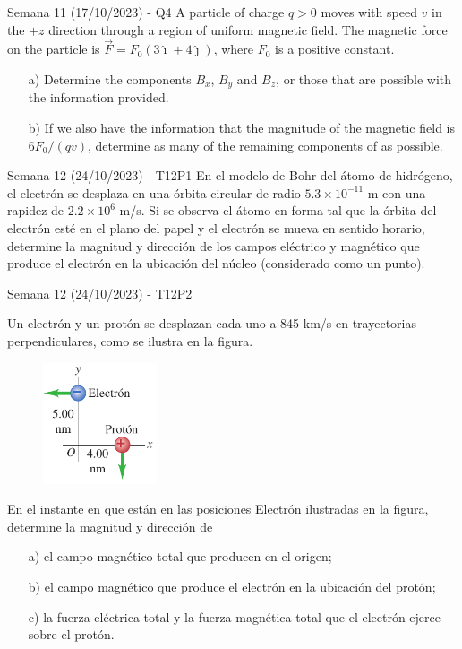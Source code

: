 \begin{frame}{Semana 11 (17/10/2023) - Q4}
    A particle of charge $q>0$ moves with speed $v$ in the $+z$ direction through a region of uniform magnetic field. The magnetic force on the particle is $\vec{F}=F_0(3\hat{\imath}+4\hat{\jmath})$, where $F_0$ is a positive constant.
\begin{itemize}
     \item[a)] Determine the components $B_x$, $B_y$ and $B_z$, or those that are possible with the information provided.
     \item[b)] If we also have the information that the magnitude of the magnetic field is $6F_0/(qv)$, determine as many of the remaining components of as possible.
\end{itemize}
\end{frame}


\begin{frame}{Semana 12 (24/10/2023) - T12P1}
     En el modelo de Bohr del átomo de hidrógeno, el electrón se desplaza en una órbita circular de radio
$5.3\times10^{-11}$ m con una rapidez de $2.2 \times 10^6$ m/s. Si se observa el
átomo en forma tal que la órbita del electrón esté en el plano del papel
y el electrón se mueva en sentido horario, determine la magnitud y
dirección de los campos eléctrico y magnético que produce el electrón
en la ubicación del núcleo (considerado como un punto).
\end{frame}

\begin{frame}{Semana 12 (24/10/2023) - T12P2}

    Un electrón y un protón se desplazan
cada uno a 845 km/s en trayectorias perpendiculares, como se ilustra en la figura.

\begin{figure}
    \centering
    \includegraphics[width=0.3\textwidth]{figures/t13p2.png}
\end{figure}

En el instante en que están en las posiciones
Electrón
ilustradas en la figura, determine la magnitud
y dirección de

\begin{itemize}
    \item[a)] el campo magnético total que producen en el origen;
    \item[b)] el campo magnético que produce el electrón en la ubicación del protón;
    \item[c)] la fuerza eléctrica total y la
fuerza magnética total que el electrón ejerce
sobre el protón.
\end{itemize}
    
\end{frame}

